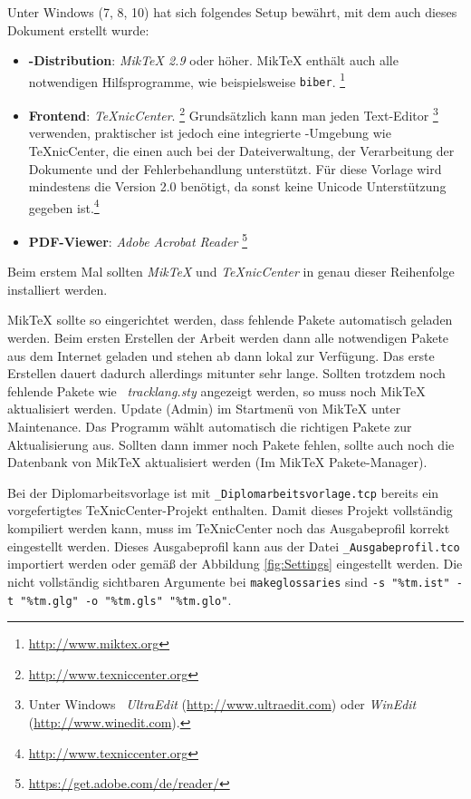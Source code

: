 Unter \gls{Windows} (7, 8, 10) hat sich folgendes Setup bewährt,
mit dem \ua auch dieses Dokument erstellt wurde:
%
\begin{itemize}
\item \textbf{\latex-Distribution}: \emph{MikTeX 2.9} oder höher.
MikTeX enthält auch alle notwendigen Hilfsprogramme, wie beispielsweise {\tt biber}.%
\footnote{\url{http://www.miktex.org}}
\item \textbf{Frontend}: \emph{TeXnicCenter}.%
\footnote{\url{http://www.texniccenter.org}}
Grundsätzlich kann man jeden Text-Editor%
\footnote{Unter Windows \zB\ \emph{Ultra\-Edit} (\url{http://www.ultraedit.com})
oder \emph{WinEdit} (\url{http://www.winedit.com}).} verwenden, praktischer ist jedoch eine integrierte \latex-Umgebung wie TeXnicCenter, die einen auch bei 
der Dateiverwaltung, der Verarbeitung der Dokumente und der Fehlerbehandlung unterstützt. Für diese Vorlage wird mindestens die Version 2.0 benötigt, da sonst keine Unicode Unterstützung gegeben ist.\footnote{\url{http://www.texniccenter.org}}
\item \textbf{PDF-Viewer}: \emph{Adobe Acrobat Reader}%
\footnote{\url{https://get.adobe.com/de/reader/}}
\end{itemize}
Beim erstem Mal sollten \emph{MikTeX} und \emph{TeXnicCenter} in genau dieser Reihenfolge installiert werden.

MikTeX sollte so eingerichtet werden, dass fehlende Pakete automatisch geladen werden. Beim ersten Erstellen der Arbeit werden dann alle notwendigen Pakete aus dem Internet geladen und stehen ab dann lokal zur Verfügung. Das erste Erstellen dauert dadurch allerdings mitunter sehr lange. Sollten trotzdem noch fehlende Pakete wie \zB\ \emph{tracklang.sty} angezeigt werden, so muss noch MikTeX aktualisiert werden. Update (Admin) im Startmenü von MikTeX unter Maintenance. Das Programm wählt automatisch die richtigen Pakete zur Aktualisierung aus. Sollten dann immer noch Pakete fehlen, sollte auch noch die Datenbank von MikTeX aktualisiert werden (Im MikTeX Pakete-Manager).

Bei der Diplomarbeitsvorlage ist mit \texttt{\_Diplomarbeitsvorlage.tcp} bereits ein vorgefertigtes TeXnicCenter-Projekt enthalten. Damit dieses Projekt vollständig kompiliert werden kann, muss im TeXnicCenter noch das Ausgabeprofil korrekt eingestellt werden. Dieses Ausgabeprofil kann aus der Datei \texttt{\_Ausgabeprofil.tco} importiert werden oder gemäß der Abbildung \ref{fig:Settings} eingestellt werden. Die nicht vollständig sichtbaren Argumente bei \texttt{makeglossaries} sind \verb|-s "%tm.ist" -t "%tm.glg" -o "%tm.gls" "%tm.glo"|.

